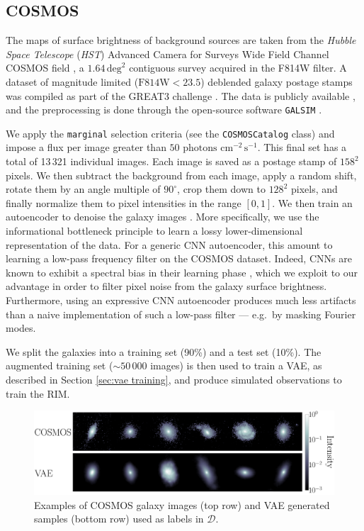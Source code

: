 \subsection{COSMOS}\label{sec:source}
The maps of surface brightness of background sources are taken from the \textit{Hubble Space Telescope} (\textit{HST}) 
Advanced Camera for Surveys Wide Field Channel COSMOS field \citep{Koekemoer2007,Scoville2007},
a $1.64\,\mathrm{deg}^{2}$ contiguous survey acquired in the F814W filter. 
A dataset of magnitude limited ($\mathrm{F814W} < 23.5$) deblended galaxy postage stamps \citep{Leauthaud2007} was compiled as 
part of the GREAT3 challenge \citep{Mandelbaum2014}. The data is 
publicly available \citep{Mandelbaum2012}, and the preprocessing is done through the open-source software 
\texttt{GALSIM} \citep{Rowe2015}. \par

We apply the 
\texttt{marginal} selection criteria (see the \texttt{COSMOSCatalog} class) and impose a flux per image
greater than $50\,\,\mathrm{photons}\,\,\mathrm{cm}^{-2}\,\mathrm{s}^{-1}$. 
This final set has a total of 13\,321 individual images.
Each image is saved as a postage stamp of $158^2$ pixels. 
We then subtract the background from each image, apply a random shift, rotate them by an angle multiple of $90^\circ$, crop them down to $128^{2}$ pixels, and finally normalize them to pixel intensities in the range $[0,1]$. We then train an autoencoder to denoise the galaxy images \citep{Vincent2008,Vincent2010}. More specifically, we use the informational bottleneck principle \citep{Tishby2000} to learn a lossy lower-dimensional representation of the data. For a generic CNN autoencoder, this amount to learning a low-pass frequency filter on the COSMOS dataset. Indeed, CNNs are known to exhibit a spectral bias in their learning phase \citep{Rahaman2018}, which we exploit to our advantage in order to filter pixel noise from the galaxy surface brightness. Furthermore, using an expressive CNN autoencoder produces much less artifacts than a naive implementation of such a low-pass filter --- e.g.\ by masking Fourier modes. 

We split the galaxies into a training set (90\%) and a test set (10\%). 
The augmented training set (${\sim50\,000}$ images) is then used to train a VAE, as described in Section \ref{sec:vae training}, and produce simulated observations to train the RIM.

\begin{figure}[t!]
        \centering
        \includegraphics[width=0.8\linewidth]{figures/gal_vae_sample}
        \caption{Examples of COSMOS galaxy images 
                (top row) and VAE generated samples (bottom row) used as labels in $\mathcal{D}$.}
        \label{fig:source}
\end{figure}


